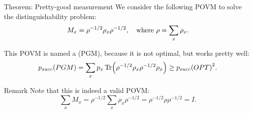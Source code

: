 \documentclass[a4paper]{article}
\begin{document}
\begin{parag}{Theorem: Pretty-good measurement}
    We consider the following POVM to solve the distinguishability problem: 
    \[M_x = \rho^{-1/2} \rho_x \rho^{-1/2}, \quad \text{where } \rho = \sum_{x} \rho_x.\]

    This POVM is named a  (PGM), because it is not optimal, but works pretty well: 
    \[p_{succ}\left(PGM\right) = \sum_{x} p_x \Tr\left(\rho^{-1/2} \rho_x \rho^{-1/2} \rho_x\right) \geq p_{succ}\left(OPT\right)^2.\]
    
    \begin{subparag}{Remark}
        Note that this is indeed a valid POVM: 
        \[\sum_{x} M_x = \rho^{-1/2} \sum_{x} \rho_x \rho^{-1/2} = \rho^{-1/2} \rho \rho^{-1/2} = I.\]
    \end{subparag}
\end{parag}
\end{document}
